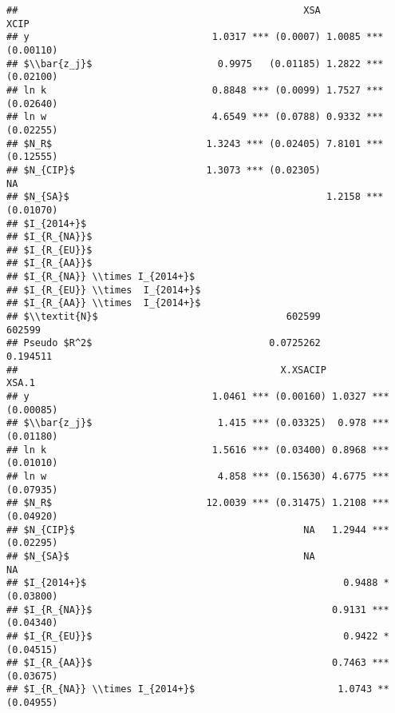 \documentclass[
]{article}
\begin{document}
\begin{verbatim}
##                                                  XSA                 XCIP
## y                                1.0317 *** (0.0007) 1.0085 *** (0.00110)
## $\\bar{z_j}$                      0.9975   (0.01185) 1.2822 *** (0.02100)
## ln k                             0.8848 *** (0.0099) 1.7527 *** (0.02640)
## ln w                             4.6549 *** (0.0788) 0.9332 *** (0.02255)
## $N_R$                           1.3243 *** (0.02405) 7.8101 *** (0.12555)
## $N_{CIP}$                       1.3073 *** (0.02305)                 NA  
## $N_{SA}$                                             1.2158 *** (0.01070)
## $I_{2014+}$                                                              
## $I_{R_{NA}}$                                                             
## $I_{R_{EU}}$                                                             
## $I_{R_{AA}}$                                                             
## $I_{R_{NA}} \\times I_{2014+}$                                           
## $I_{R_{EU}} \\times  I_{2014+}$                                          
## $I_{R_{AA}} \\times  I_{2014+}$                                          
## $\\textit{N}$                                 602599               602599
## Pseudo $R^2$                               0.0725262             0.194511
##                                              X.XSACIP                XSA.1
## y                                1.0461 *** (0.00160) 1.0327 *** (0.00085)
## $\\bar{z_j}$                      1.415 *** (0.03325)  0.978 *** (0.01180)
## ln k                             1.5616 *** (0.03400) 0.8968 *** (0.01010)
## ln w                              4.858 *** (0.15630) 4.6775 *** (0.07935)
## $N_R$                           12.0039 *** (0.31475) 1.2108 *** (0.04920)
## $N_{CIP}$                                        NA   1.2944 *** (0.02295)
## $N_{SA}$                                         NA                   NA  
## $I_{2014+}$                                             0.9488 * (0.03800)
## $I_{R_{NA}}$                                          0.9131 *** (0.04340)
## $I_{R_{EU}}$                                            0.9422 * (0.04515)
## $I_{R_{AA}}$                                          0.7463 *** (0.03675)
## $I_{R_{NA}} \\times I_{2014+}$                         1.0743 ** (0.04955)

\end{verbatim}
\end{document}
